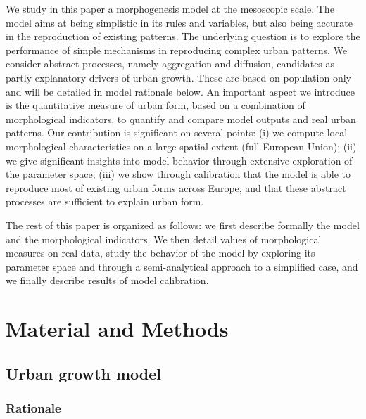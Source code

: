 \documentclass[10pt,letterpaper]{article}
\begin{document}
We study in this paper a morphogenesis model at the mesoscopic scale. The model aims at being simplistic in its rules and variables, but also being accurate in the reproduction of existing patterns. The underlying question is to explore the performance of simple mechanisms in reproducing complex urban patterns. We consider abstract processes, namely aggregation and diffusion, candidates as partly explanatory drivers of urban growth. These are based on population only and will be detailed in model rationale below. An important aspect we introduce is the quantitative measure of urban form, based on a combination of morphological indicators, to quantify and compare model outputs and real urban patterns. Our contribution is significant on several points: (i) we compute local morphological characteristics on a large spatial extent (full European Union); (ii) we give significant insights into model behavior through extensive exploration of the parameter space; (iii) we show through calibration that the model is able to reproduce most of existing urban forms across Europe, and that these abstract processes are sufficient to explain urban form.


The rest of this paper is organized as follows: we first describe formally the model and the morphological indicators. We then detail values of morphological measures on real data, study the behavior of the model by exploring its parameter space and through a semi-analytical approach to a simplified case, and we finally describe results of model calibration.


\section*{Material and Methods}


\subsection*{Urban growth model}



\subsubsection*{Rationale}
\end{document}
